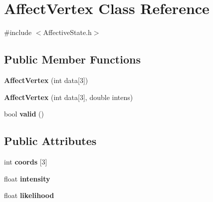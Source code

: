 \hypertarget{class_affect_vertex}{
\section{\-Affect\-Vertex \-Class \-Reference}
\label{class_affect_vertex}
}


{\ttfamily \#include $<$\-Affective\-State.\-h$>$}

\subsection*{\-Public \-Member \-Functions}
\begin{DoxyCompactItemize}
\item 
\hypertarget{class_affect_vertex_a50e338d93dd0a38d4089fc14284761a4}{
{\bfseries \-Affect\-Vertex} (int data\mbox{[}3\mbox{]})}
\label{class_affect_vertex_a50e338d93dd0a38d4089fc14284761a4}

\item 
\hypertarget{class_affect_vertex_aec1f32cfd8c8fa579a1adbbc34af4d24}{
{\bfseries \-Affect\-Vertex} (int data\mbox{[}3\mbox{]}, double intens)}
\label{class_affect_vertex_aec1f32cfd8c8fa579a1adbbc34af4d24}

\item 
\hypertarget{class_affect_vertex_a6ca4a6bf072257b5accc4389f3f6e6e5}{
bool {\bfseries valid} ()}
\label{class_affect_vertex_a6ca4a6bf072257b5accc4389f3f6e6e5}

\end{DoxyCompactItemize}
\subsection*{\-Public \-Attributes}
\begin{DoxyCompactItemize}
\item 
\hypertarget{class_affect_vertex_a0ffa48aa0df4356da53708a938e53e83}{
int {\bfseries coords} \mbox{[}3\mbox{]}}
\label{class_affect_vertex_a0ffa48aa0df4356da53708a938e53e83}

\item 
\hypertarget{class_affect_vertex_a9742362a1036509af353b1fa7d5d382b}{
float {\bfseries intensity}}
\label{class_affect_vertex_a9742362a1036509af353b1fa7d5d382b}

\item 
\hypertarget{class_affect_vertex_aa659889f294516bbb779909dbf83a1ed}{
float {\bfseries likelihood}}
\label{class_affect_vertex_aa659889f294516bbb779909dbf83a1ed}

\end{DoxyCompactItemize}



